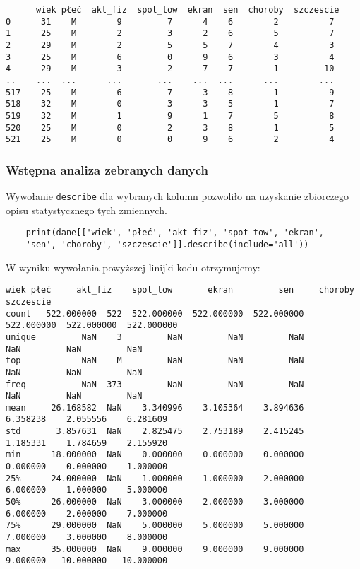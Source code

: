 \documentclass[12pt,a4paper]{article}
\begin{document}
\begin{lstlisting}
      wiek płeć  akt_fiz  spot_tow  ekran  sen  choroby  szczescie
0      31    M        9         7      4    6        2          7
1      25    M        2         3      2    6        5          7
2      29    M        2         5      5    7        4          3
3      25    M        6         0      9    6        3          4
4      29    M        3         2      7    7        1         10
..    ...  ...      ...       ...    ...  ...      ...        ...
517    25    M        6         7      3    8        1          9
518    32    M        0         3      3    5        1          7
519    32    M        1         9      1    7        5          8
520    25    M        0         2      3    8        1          5
521    25    M        0         0      9    6        2          4
\end{lstlisting}

\subsubsection{Wstępna analiza zebranych danych}

Wywołanie \texttt{describe} dla wybranych kolumn pozwoliło na uzyskanie zbiorczego opisu statystycznego tych zmiennych. 
\begin{lstlisting}
    print(dane[['wiek', 'płeć', 'akt_fiz', 'spot_tow', 'ekran', 
    'sen', 'choroby', 'szczescie']].describe(include='all'))
\end{lstlisting}
W wyniku wywołania powyższej linijki kodu otrzymujemy:
\begin{lstlisting}[basicstyle=\ttfamily\fontsize{7}{8}\selectfont\color{black},
  keywordstyle=\color{black},
  commentstyle=\color{black},
  stringstyle=\color{black},
  frame=single]
              wiek płeć     akt_fiz    spot_tow       ekran         sen     choroby   szczescie
count   522.000000  522  522.000000  522.000000  522.000000  522.000000  522.000000  522.000000
unique         NaN    3         NaN         NaN         NaN         NaN         NaN         NaN
top            NaN    M         NaN         NaN         NaN         NaN         NaN         NaN
freq           NaN  373         NaN         NaN         NaN         NaN         NaN         NaN
mean     26.168582  NaN    3.340996    3.105364    3.894636    6.358238    2.055556    6.281609
std       3.857631  NaN    2.825475    2.753189    2.415245    1.185331    1.784659    2.155920
min      18.000000  NaN    0.000000    0.000000    0.000000    0.000000    0.000000    1.000000
25%      24.000000  NaN    1.000000    1.000000    2.000000    6.000000    1.000000    5.000000
50%      26.000000  NaN    3.000000    2.000000    3.000000    6.000000    2.000000    7.000000
75%      29.000000  NaN    5.000000    5.000000    5.000000    7.000000    3.000000    8.000000
max      35.000000  NaN    9.000000    9.000000    9.000000    9.000000   10.000000   10.000000
\end{lstlisting}
\end{document}
